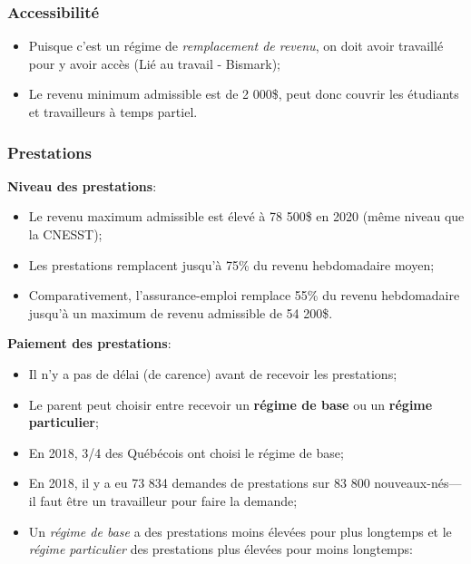 \documentclass[10pt, french]{article}
\begin{document}
\begin{multicols*}{3}
\subsubsection*{Accessibilité}
\begin{itemize}[leftmargin = *]
	\item	Puisque c'est un régime de \textit{remplacement de revenu}, on doit avoir travaillé pour y avoir accès (Lié au travail - Bismark);
	\item	Le revenu minimum admissible est de 2 000\$, peut donc couvrir les étudiants et travailleurs à temps partiel.
\end{itemize}

\subsubsection*{Prestations}
\textbf{Niveau des prestations}:
\begin{itemize}[leftmargin = *]
	\item	Le revenu maximum admissible est élevé à 78 500\$ en 2020 (même niveau que la CNESST);
	\item	Les prestations remplacent jusqu'à 75\% du revenu hebdomadaire moyen;
	\item	Comparativement, l'assurance-emploi remplace 55\% du revenu hebdomadaire jusqu'à un maximum de revenu admissible de 54 200\$.
\end{itemize}

\textbf{Paiement des prestations}:
\begin{itemize}[leftmargin = *]
	\item	Il n'y a pas de délai (de carence) avant de recevoir les prestations;
	\item	Le parent peut choisir entre recevoir un \textbf{régime de base} ou un \textbf{régime particulier};
	\item	En 2018, 3/4 des Québécois ont choisi le régime de base;
	\item	En 2018, il y a eu 73 834 demandes de prestations sur 83 800 nouveaux-nés---il faut être un travailleur pour faire la demande;
	\item	Un \textit{régime de base} a des prestations moins élevées pour plus longtemps et le \textit{régime particulier} des prestations plus élevées pour moins longtemps:
\end{itemize}


\end{multicols*}
\end{document}
